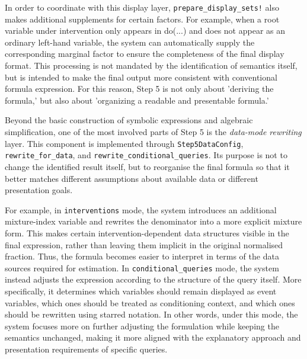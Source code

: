 \documentclass[a4paper]{report}
\begin{document}
In order to coordinate with this display layer, \texttt{prepare\_display\_sets!} also makes additional supplements for certain factors. For example, when a root variable under intervention only appears in do(...) and does not appear as an ordinary left-hand variable, the system can automatically supply the corresponding marginal factor to ensure the completeness of the final display format. This processing is not mandated by the identification of semantics itself, but is intended to make the final output more consistent with conventional formula expression. For this reason, Step 5 is not only about 'deriving the formula,' but also about 'organizing a readable and presentable formula.'

Beyond the basic construction of symbolic expressions and algebraic simplification, one of the most involved parts of Step 5 is the \emph{data-mode rewriting} layer. 
This component is implemented through \texttt{Step5DataConfig}, \texttt{rewrite\_for\_data}, and \texttt{rewrite\_conditional\_queries}. 
Its purpose is not to change the identified result itself, but to reorganise the final formula so that it better matches different assumptions about available data or different presentation goals. 

For example, in \texttt{interventions} mode, the system introduces an additional mixture-index variable and rewrites the denominator into a more explicit mixture form. This makes certain intervention-dependent data structures visible in the final expression, rather than leaving them implicit in the original normalised fraction. Thus, the formula becomes easier to interpret in terms of the data sources required for estimation.
In \texttt{conditional\_queries} mode, the system instead adjusts the expression according to the structure of the query itself. More specifically, it determines which variables should remain displayed as event variables, which ones should be treated as conditioning context, and which ones should be rewritten using starred notation. In other words, under this mode, the system focuses more on further adjusting the formulation while keeping the semantics unchanged, making it more aligned with the explanatory approach and presentation requirements of specific queries.
\end{document}
